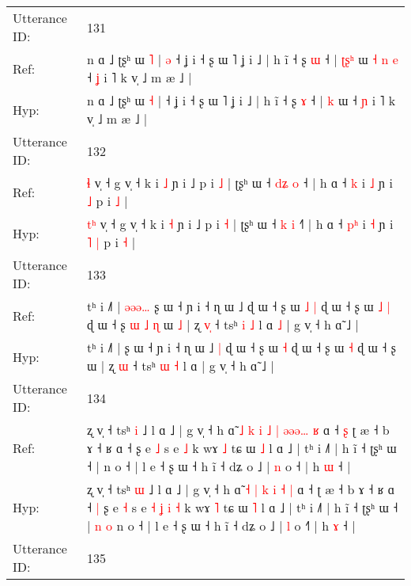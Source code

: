 \documentclass[10pt]{article}
\DeclareRobustCommand{\hl}[1]{{\textcolor{red}{#1}}}
\begin{document}
\begin{longtable}{ll}
 \\
\midrule
Utterance ID: & 131 \\
Ref: & n ɑ ˩ ʈʂʰ ɯ \hl{˥} |\hl{ }\hl{ə} ˧ ʝ i ˧ ʂ ɯ ˥ ʝ i ˩ | h ĩ ˧ ʂ \hl{ɯ} ˧ | \hl{ʈ}\hl{ʂ}\hl{ʰ} ɯ\hl{ }\hl{˧}\hl{ }\hl{n}\hl{ }\hl{e} ˧ \hl{ʝ} i ˥ k v̩ ˩ m æ ˩ |
 \\
Hyp: & n ɑ ˩ ʈʂʰ ɯ \hl{˧} |\hl{}\hl{} ˧ ʝ i ˧ ʂ ɯ ˥ ʝ i ˩ | h ĩ ˧ ʂ \hl{ɤ} ˧ | \hl{}\hl{}\hl{k} ɯ\hl{}\hl{}\hl{}\hl{}\hl{}\hl{} ˧ \hl{ɲ} i ˥ k v̩ ˩ m æ ˩ |
 \\
\midrule
Utterance ID: & 132 \\
Ref: & \hl{}\hl{ɬ} v̩ ˧ g v̩ ˧ k i \hl{˩} ɲ i ˩ p i \hl{˩} | ʈʂʰ ɯ ˧ \hl{d}\hl{ʑ} \hl{o} ˧\hl{} | h ɑ ˧ \hl{}\hl{k} i \hl{˩} ɲ i\hl{}\hl{} \hl{˩} p i \hl{˩} |
 \\
Hyp: & \hl{t}\hl{ʰ} v̩ ˧ g v̩ ˧ k i \hl{˧} ɲ i ˩ p i \hl{˧} | ʈʂʰ ɯ ˧ \hl{}\hl{k} \hl{i} ˧\hl{˥} | h ɑ ˧ \hl{p}\hl{ʰ} i \hl{˧} ɲ i\hl{ }\hl{˥} \hl{|} p i \hl{˧} |
 \\
\midrule
Utterance ID: & 133 \\
Ref: & tʰ i ˩˥ |\hl{ }\hl{ə}\hl{ə}\hl{ə}\hl{…} ʂ ɯ ˧ ɲ i ˧ ɳ ɯ ˩\hl{}\hl{} ɖ ɯ ˧ ʂ ɯ\hl{ }\hl{˩} \hl{|} ɖ ɯ ˧ ʂ ɯ\hl{ }\hl{˩} \hl{|} ɖ ɯ ˧ ʂ\hl{ }\hl{ɯ}\hl{ }\hl{˩}\hl{ }\hl{ɳ} ɯ\hl{ }\hl{˩} | ʐ \hl{v}\hl{̩} ˧ tsʰ \hl{i} \hl{˩} l ɑ\hl{ }\hl{˩} | g v̩ ˧ h ɑ̃ ˩ |
 \\
Hyp: & tʰ i ˩˥ |\hl{}\hl{}\hl{}\hl{}\hl{} ʂ ɯ ˧ ɲ i ˧ ɳ ɯ ˩\hl{ }\hl{|} ɖ ɯ ˧ ʂ ɯ\hl{}\hl{} \hl{˧} ɖ ɯ ˧ ʂ ɯ\hl{}\hl{} \hl{˧} ɖ ɯ ˧ ʂ\hl{}\hl{}\hl{}\hl{}\hl{}\hl{} ɯ\hl{}\hl{} | ʐ \hl{}\hl{ɯ} ˧ tsʰ \hl{ɯ} \hl{˧} l ɑ\hl{}\hl{} | g v̩ ˧ h ɑ̃ ˩ |
 \\
\midrule
Utterance ID: & 134 \\
Ref: & ʐ v̩ ˧ tsʰ \hl{i} ˩ l ɑ ˩ | g v̩ ˧ h ɑ̃\hl{ }\hl{˩} \hl{k} \hl{i} \hl{˩} \hl{|} \hl{ə}\hl{ə}\hl{ə}\hl{…} \hl{ʁ} ɑ ˧\hl{ }\hl{ʂ} ʈ æ ˧ b ɤ ˧ ʁ ɑ ˧\hl{}\hl{} ʂ e \hl{˩} s e\hl{}\hl{}\hl{}\hl{}\hl{}\hl{} \hl{˩} k wɤ \hl{˩} tɕ ɯ \hl{˩} l ɑ ˩ | tʰ i ˩˥ | h ĩ ˧ ʈʂʰ ɯ ˧ |\hl{}\hl{}\hl{}\hl{} n o ˧ | l e ˧ ʂ ɯ ˧ h ĩ ˧ dʑ o ˩ | \hl{n} o ˧\hl{} | h \hl{ɯ} ˧ |
 \\
Hyp: & ʐ v̩ ˧ tsʰ \hl{ɯ} ˩ l ɑ ˩ | g v̩ ˧ h ɑ̃\hl{}\hl{} \hl{˧} \hl{|} \hl{k} \hl{i} \hl{}\hl{}\hl{}\hl{˧} \hl{|} ɑ ˧\hl{}\hl{} ʈ æ ˧ b ɤ ˧ ʁ ɑ ˧\hl{ }\hl{|} ʂ e \hl{˧} s e\hl{ }\hl{˧}\hl{ }\hl{ʝ}\hl{ }\hl{i} \hl{˧} k wɤ \hl{˥} tɕ ɯ \hl{˥} l ɑ ˩ | tʰ i ˩˥ | h ĩ ˧ ʈʂʰ ɯ ˧ |\hl{ }\hl{n}\hl{ }\hl{o} n o ˧ | l e ˧ ʂ ɯ ˧ h ĩ ˧ dʑ o ˩ | \hl{l} o ˧\hl{˥} | h \hl{ɤ} ˧ |
 \\
\midrule
Utterance ID: & 135 \\

\end{longtable}
\end{document}
